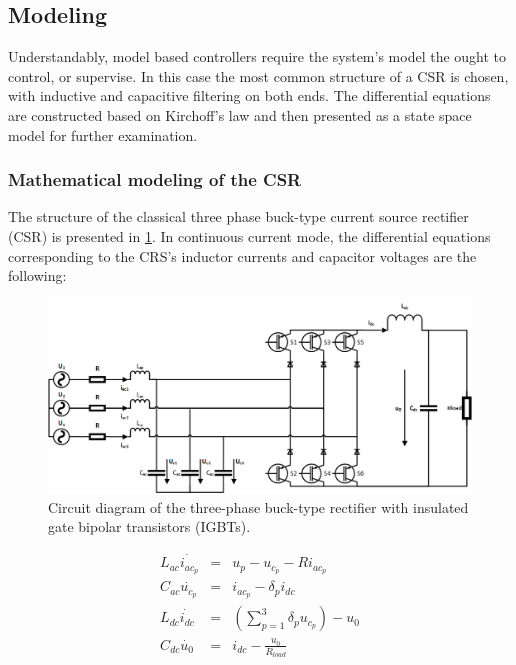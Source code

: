 \subsection{Modeling}\label{EMPC:sec:Modeling}

Understandably, model based controllers require the system's model the ought to control, or supervise. In this case the most common structure of a CSR is chosen, with inductive and capacitive filtering on both ends. The differential equations are constructed based on Kirchoff's law and then presented as a state space model for further examination.

\subsubsection{Mathematical modeling of the CSR}\label{EMPC:sec:ModelofCSR}

    The structure of the classical three phase buck-type current source rectifier (CSR) is presented in \ref{EMPC:fig:network}. In continuous current mode, the differential equations corresponding to the CRS’s inductor currents and capacitor voltages are the following:

    \begin{figure}[!ht]
        \centering
        \includegraphics[width=\textwidth]{EMPC_PNG_Pics/circuit.png}
        \caption{Circuit diagram of the three-phase buck-type rectifier with insulated gate bipolar transistors (IGBTs).}
        \label{EMPC:fig:network}
    \end{figure}
		
        \begin{equation}
        \begin{array}{rcl}
            L_{ac}\dot{i_{ac_p}}&=&u_p-u_{c_p}-Ri_{ac_p}\\
            C_{ac}\dot{u_{c_p}}&=&i_{ac_p}-\delta_pi_{dc}\\
            L_{dc}\dot{i_{dc}}&=&(\sum_{p=1}^{3}\delta_pu_{c_p})-u_0\\
            C_{dc}\dot{u_0}&=&i_{dc}-\frac{u_0}{R_{load}}\\
        \end{array}
        \label{EMPC:equ:abc_eqn}
    \end{equation}

